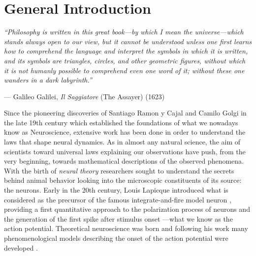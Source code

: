 \chapter*{\bf \sffamily General Introduction}
\label{cha:intro}

\epigraph{\it ``Philosophy is written in this great book---by which I
  mean the universe---which stands always open to our view, but it
  cannot be understood unless one first learns how to comprehend the
  language and interpret the symbols in which it is written, and its
  symbols are triangles, circles, and other geometric figures, without
  which it is not humanly possible to comprehend even one word of it;
  without these one wanders in a dark labyrinth.''}{---
  \textup{Galileo Galilei}, \textit{Il Saggiatore} (The Assayer) (1623)}




\noindent
Since the pioneering discoveries of Santiago Ramon y Cajal and Camilo Golgi in
the late 19th century which established the foundations of what we nowadays know as
Neuroscience, extensive work has been done in order to understand the
laws that shape neural dynamics. As in almost any natural science,
the aim of scientists toward universal laws explaining our
observations have push, from the very beginning, towards mathematical
descriptions of the observed phenomena. With the birth of 
\textit{neural theory} researchers sought to understand the secrets
behind animal behavior looking into the microscopic constituents of
its source: the neurons. Early in the 20th century,
Louis Lapicque introduced what is considered as the precursor  of
the famous integrate-and-fire model neuron \citep{Brunel2007}
\citep[see also][]{Brunel2007a,Abbott1999}, providing a first quantitative approach to the polarization
process of neurons and the generation of the  
first spike after stimulus onset ---what we know as
the action potential. Theoretical
neuroscience was born and following his work many phenomenological
models describing the onset of the action potential were developed
\citep{Hill1936,McCulloch1943,Stein1965,Geisler1966,Weiss1966,Stein1967b}.

